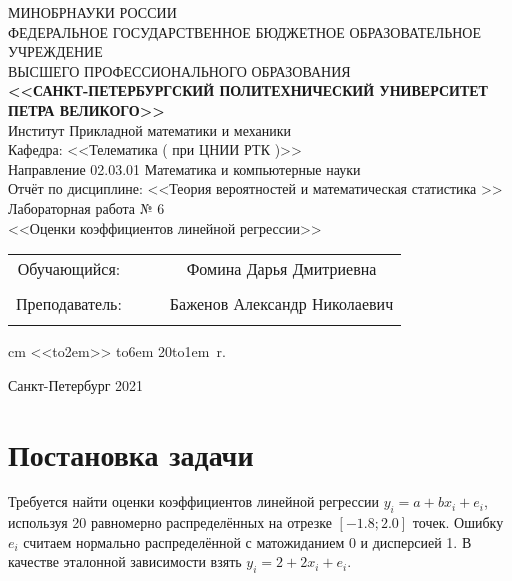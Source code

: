\documentclass[12pt]{article}
\begin{document}
\begin{center}
\hfill \break
\large{МИНОБРНАУКИ РОССИИ} \\
\hfill \break
\small {ФЕДЕРАЛЬНОЕ ГОСУДАРСТВЕННОЕ БЮДЖЕТНОЕ ОБРАЗОВАТЕЛЬНОЕ УЧРЕЖДЕНИЕ }\\
\small { ВЫСШЕГО ПРОФЕССИОНАЛЬНОГО ОБРАЗОВАНИЯ  } \\
\hfill \break
\normalsize {\textbf{ <<САНКТ-ПЕТЕРБУРГСКИЙ ПОЛИТЕХНИЧЕСКИЙ УНИВЕРСИТЕТ } }\\
{\normalsize {\textbf { ПЕТРА ВЕЛИКОГО>>}}} \\
\hfill \break
\large{Институт Прикладной математики и механики }\\
\hfill \break
\large{ Кафедра: <<Телематика ( при ЦНИИ РТК )>> }\\
\hfill \break
Направление 02.03.01 Математика и компьютерные науки\\
\vskip 1cm
\Large {Отчёт по дисциплине:}
\vskip 0.2cm
\Large{<<Теория вероятностей и математическая статистика >>} \\
\hfill \break
\large{Лабораторная работа № 6} \\
\hfill \break
\large{<<Оценки коэффициентов линейной регрессии>>} \\
\hfill \break
\vskip 0.3cm
\vskip 1cm
\end{center}


\begin {tabular}{cccc}
\hspace{0.5cm}Обучающийся: &\underline {\hspace{3cm}} &  &Фомина Дарья Дмитриевна \\\\
\hspace{0.5cm}Преподаватель: &\underline {\hspace{3cm}} & &Баженов Александр Николаевич\\\\
\end{tabular}
 cm
\hspace{9cm}\def \hrf#1{\hbox to#1{\hrulefill}}<<\hrf{2em}>>  \hrf{6em}  20\hrf{1em}~r.
\vskip 1.5cm
\begin {center} Санкт-Петербург 2021 \end{center}

\thispagestyle{empty}

\newpage


\tableofcontents


\newpage
\section{Постановка задачи}
Требуется найти оценки коэффициентов линейной регрессии $y_i = a + bx_i + e_i$, используя 20 равномерно распределённых на отрезке $[-1.8; 2.0]$ точек. Ошибку $e_i$ считаем нормально распределённой с матожиданием 0 и дисперсией 1. В качестве эталонной зависимости взять $y_i = 2 + 2x_i + e_i$.
\end{document}
